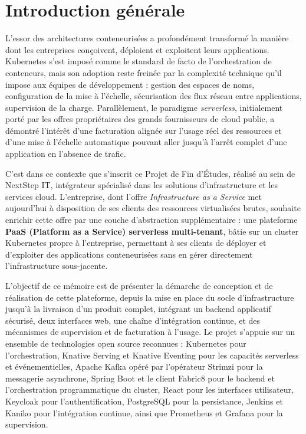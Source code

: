 
\chapter*{Introduction générale}

L'essor des architectures conteneurisées a profondément transformé la manière dont les entreprises conçoivent, déploient et exploitent leurs applications. Kubernetes s'est imposé comme le standard de facto de l'orchestration de conteneurs, mais son adoption reste freinée par la complexité technique qu'il impose aux équipes de développement : gestion des espaces de noms, configuration de la mise à l'échelle, sécurisation des flux réseau entre applications, supervision de la charge. Parallèlement, le paradigme \textit{serverless}, initialement porté par les offres propriétaires des grands fournisseurs de cloud public, a démontré l'intérêt d'une facturation alignée sur l'usage réel des ressources et d'une mise à l'échelle automatique pouvant aller jusqu'à l'arrêt complet d'une application en l'absence de trafic.

C'est dans ce contexte que s'inscrit ce Projet de Fin d'Études, réalisé au sein de NextStep IT, intégrateur spécialisé dans les solutions d'infrastructure et les services cloud. L'entreprise, dont l'offre \textit{Infrastructure as a Service} met aujourd'hui à disposition de ses clients des ressources virtualisées brutes, souhaite enrichir cette offre par une couche d'abstraction supplémentaire : une plateforme \textbf{PaaS (Platform as a Service) serverless multi-tenant}, bâtie sur un cluster Kubernetes propre à l'entreprise, permettant à ses clients de déployer et d'exploiter des applications conteneurisées sans en gérer directement l'infrastructure sous-jacente.

L'objectif de ce mémoire est de présenter la démarche de conception et de réalisation de cette plateforme, depuis la mise en place du socle d'infrastructure jusqu'à la livraison d'un produit complet, intégrant un backend applicatif sécurisé, deux interfaces web, une chaîne d'intégration continue, et des mécanismes de supervision et de facturation à l'usage. Le projet s'appuie sur un ensemble de technologies open source reconnues : Kubernetes pour l'orchestration, Knative Serving et Knative Eventing pour les capacités serverless et événementielles, Apache Kafka opéré par l'opérateur Strimzi pour la messagerie asynchrone, Spring Boot et le client Fabric8 pour le backend et l'orchestration programmatique du cluster, React pour les interfaces utilisateur, Keycloak pour l'authentification, PostgreSQL pour la persistance, Jenkins et Kaniko pour l'intégration continue, ainsi que Prometheus et Grafana pour la supervision.

